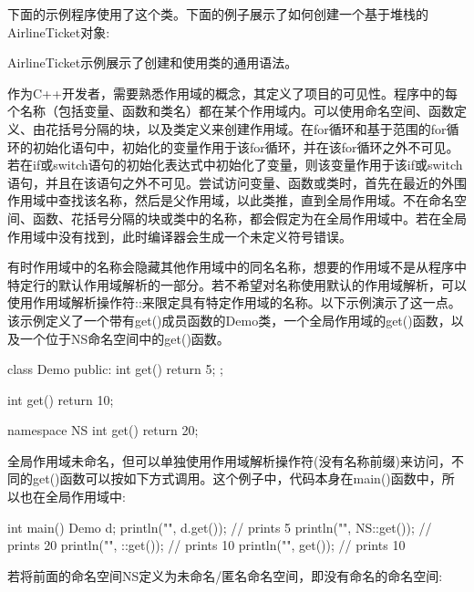 下面的示例程序使用了这个类。下面的例子展示了如何创建一个基于堆栈的AirlineTicket对象:


AirlineTicket示例展示了创建和使用类的通用语法。


作为C++开发者，需要熟悉作用域的概念，其定义了项目的可见性。程序中的每个名称（包括变量、函数和类名）都在某个作用域内。可以使用命名空间、函数定义、由花括号分隔的块，以及类定义来创建作用域。在for循环和基于范围的for循环的初始化语句中，初始化的变量作用于该for循环，并在该for循环之外不可见。若在if或switch语句的初始化表达式中初始化了变量，则该变量作用于该if或switch语句，并且在该语句之外不可见。尝试访问变量、函数或类时，首先在最近的外围作用域中查找该名称，然后是父作用域，以此类推，直到全局作用域。不在命名空间、函数、花括号分隔的块或类中的名称，都会假定为在全局作用域中。若在全局作用域中没有找到，此时编译器会生成一个未定义符号错误。

有时作用域中的名称会隐藏其他作用域中的同名名称，想要的作用域不是从程序中特定行的默认作用域解析的一部分。若不希望对名称使用默认的作用域解析，可以使用作用域解析操作符::来限定具有特定作用域的名称。以下示例演示了这一点。该示例定义了一个带有get()成员函数的Demo类，一个全局作用域的get()函数，以及一个位于NS命名空间中的get()函数。

\begin{cpp}
class Demo
{
    public:
    int get() { return 5; }
};

int get() { return 10; }

namespace NS
{
    int get() { return 20; }
}
\end{cpp}

全局作用域未命名，但可以单独使用作用域解析操作符(没有名称前缀)来访问，不同的get()函数可以按如下方式调用。这个例子中，代码本身在main()函数中，所以也在全局作用域中:

\begin{cpp}
int main()
{
    Demo d;
    println("{}", d.get()); // prints 5
    println("{}", NS::get()); // prints 20
    println("{}", ::get()); // prints 10
    println("{}", get()); // prints 10
}
\end{cpp}

若将前面的命名空间NS定义为未命名/匿名命名空间，即没有命名的命名空间:

